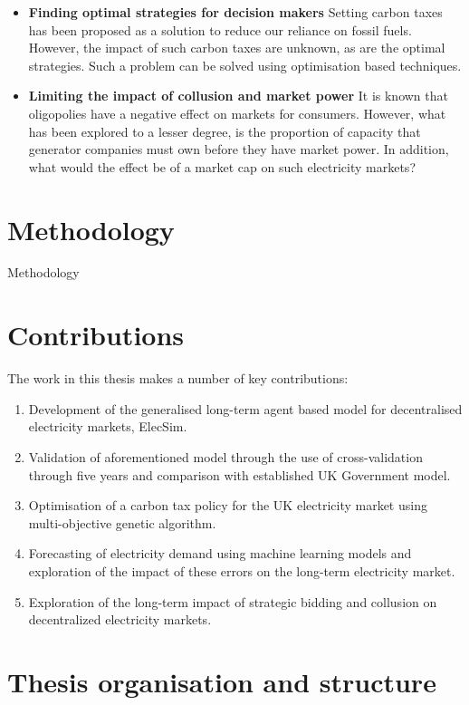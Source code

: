 \begin{itemize}
	\item \textbf{Finding optimal strategies for decision makers} Setting carbon taxes has been proposed as a solution to reduce our reliance on fossil fuels. However, the impact of such carbon taxes are unknown, as are the optimal strategies. Such a problem can be solved using optimisation based techniques.

	\item \textbf{Limiting the impact of collusion and market power} It is known that oligopolies have a negative effect on markets for consumers. However, what has been explored to a lesser degree, is the proportion of capacity that generator companies must own before they have market power. In addition, what would the effect be of a market cap on such electricity markets? 

\end{itemize}

\section{Methodology}

Methodology

\section{Contributions}

The work in this thesis makes a number of key contributions:

\begin{enumerate}
	\item Development of the generalised long-term agent based model for decentralised electricity markets, ElecSim.
	\item Validation of aforementioned model through the use of cross-validation through five years and comparison with established UK Government model.
	\item Optimisation of a carbon tax policy for the UK electricity market using multi-objective genetic algorithm.
	\item Forecasting of electricity demand using machine learning models and exploration of the impact of these errors on the long-term electricity market.
	\item Exploration of the long-term impact of strategic bidding and collusion on decentralized electricity markets.
\end{enumerate}

\section{Thesis organisation and structure}



